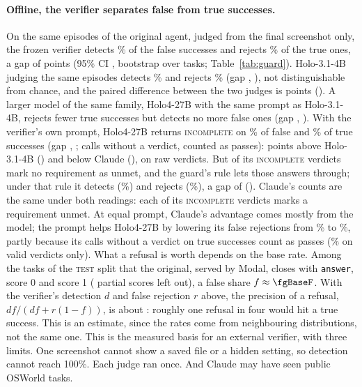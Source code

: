 \paragraph{Offline, the verifier separates false from true successes.} On the same \gbEpisodes{} episodes of the original agent, judged from the final screenshot only, the frozen verifier detects \gbClaudeDet\% of the false successes and rejects \gbClaudeRej\% of the true ones, a gap of \gbClaudeGap{} points (95\% CI \gbClaudeGapCi, bootstrap over \gbTasks{} tasks; Table~\ref{tab:guard}). Holo-3.1-4B judging the same episodes detects \gbHoloDet\% and rejects \gbHoloRej\% (gap \gbHoloGap, \gbHoloGapCi), not distinguishable from chance, and the paired difference between the two judges is \gbClaudeVsHolo{} points (\gbClaudeVsHoloCi). A larger model of the same family, Holo4-27B with the same prompt as Holo-3.1-4B, rejects fewer true successes but detects no more false ones (gap \gbHolofourGap, \gbHolofourGapCi). With the verifier's own prompt, Holo4-27B returns \textsc{incomplete} on \gbHolofourfeciDet\% of false and \gbHolofourfeciRej\% of true successes (gap \gbHolofourfeciGap, \gbHolofourfeciGapCi; \gbHolofourfeciNoVerdict{} calls without a verdict, counted as passes): \gbHolofourfeciVsHolo{} points above Holo-3.1-4B (\gbHolofourfeciVsHoloCi) and \gbHolofourfeciVsClaude{} below Claude (\gbHolofourfeciVsClaudeCi), on raw verdicts. But \gbHolofourruleDropped{} of its \gbHolofourruleRawInc{} \textsc{incomplete} verdicts mark no requirement as unmet, and the guard's rule lets those answers through; under that rule it detects \gbHolofourruleDetN{} (\gbHolofourruleDet\%) and rejects \gbHolofourruleRejN{} (\gbHolofourruleRej\%), a gap of \gbHolofourruleGap{} (\gbHolofourruleGapCi). Claude's counts are the same under both readings: each of its \textsc{incomplete} verdicts marks a requirement unmet. At equal prompt, Claude's advantage comes mostly from the model; the prompt helps Holo4-27B by lowering its false rejections from \gbHolofourRej\% to \gbHolofourfeciRej\%, partly because its \gbHolofourfeciNoVerdictTrue{} calls without a verdict on true successes count as passes (\gbHolofourfeciRejValid\% on valid verdicts only). What a refusal is worth depends on the base rate. Among the tasks of the \textsc{test} split that the original, served by Modal, closes with \texttt{answer}, \fgBaseFsDone{} score 0 and \fgBaseTrueDone{} score 1 (\fgBasePartialDone{} partial scores left out), a false share $f\approx\fgBaseF$. With the verifier's detection $d$ and false rejection $r$ above, the precision of a refusal, $df/(df+r(1-f))$, is about \fgPrecision: roughly one refusal in four would hit a true success. This is an estimate, since the rates come from neighbouring distributions, not the same one. %
This is the measured basis for an external verifier, with three limits. One screenshot cannot show a saved file or a hidden setting, so detection cannot reach 100\%. Each judge ran once. And Claude may have seen public OSWorld tasks. %

